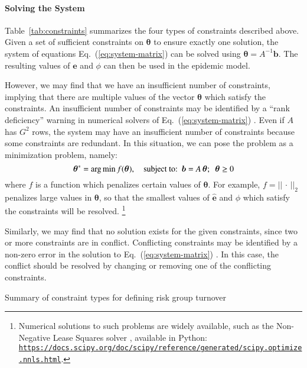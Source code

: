 \paragraph{Solving the System}
\label{p:solving}
Table~\ref{tab:constraints} summarizes the four types of constraints described above.
Given a set of sufficient constraints on $\bm{\theta}$
to ensure exactly one solution, the system of equations Eq.~(\ref{eq:system-matrix})
can be solved using $\bm{\theta} = A^{-1}\bm{b}$.
The resulting values of $\bm{\hat{e}}$ and $\phi$ can then be used
in the epidemic model.
\par
However, we may find that we have an insufficient number of constraints, implying that
there are multiple values of the vector $\bm{\theta}$ which satisfy the constraints.
An insufficient number of constraints may be identified
by a ``rank deficiency'' warning
in numerical solvers of Eq.~(\ref{eq:system-matrix}) \citep{LAPACK}.
Even if $A$ has $G^2$ rows,
the system may have an insufficient number of constraints
because some constraints are redundant.
In this situation, we can pose the problem as a minimization problem, namely:
\begin{equation}\label{eq:system-optimize}
\bm{\theta}^{*} = {\arg \min}
\thinspace f(\bm{\theta}),
\quad \textrm{subject to:}
\enspace\bm{b} = A\thinspace\bm{\theta};
\enspace\bm{\theta} \ge 0
\end{equation}
where $f$ is a function which penalizes certain values of $\bm{\theta}$.
For example, $f = {\left|\left| \,\cdot\, \right|\right|}_2$
penalizes large values in $\bm{\theta}$,
so that the smallest values of $\bm{\hat{e}}$ and $\phi$
which satisfy the constraints will be resolved.%
\footnote{Numerical solutions to such problems are widely available,
  such as the Non-Negative Lease Squares solver \citep{Lawson1995},
  available in Python:
   \href{https://docs.scipy.org/doc/scipy/reference/generated/scipy.optimize.nnls.html}
{\texttt{https://docs.scipy.org/doc/scipy/reference/generated/scipy.optimize.nnls.html}}.}
\par
Similarly, we may find that no solution exists for the given constraints,
since two or more constraints are in conflict.
Conflicting constraints may be identified by a non-zero error
in the solution to Eq.~(\ref{eq:system-matrix}) \citep{LAPACK}.
In this case, the conflict should be resolved by
changing or removing one of the conflicting constraints.
\begin{table}
  \centering
  \caption{Summary of constraint types for defining risk group turnover}
  \label{tab:constraints}
  
\end{table}
